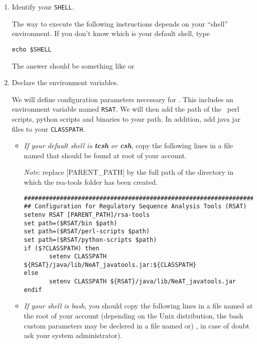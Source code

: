 \begin{enumerate}

\item Identify your \texttt{SHELL}.

  The way to execute the following instructions depends on your
  ``shell'' environment. If you don't know which is your default
  shell, type

\lstset{language=csh}

\begin{lstlisting}
echo $SHELL
\end{lstlisting}

The answer should be something like  or

\item Declare the \RSAT environment variables.

  We will define configuration parameters necessary for \RSAT.  This
  includes an environment variable named \texttt{RSAT}.  We will then
  add the path of the \RSAT \ perl scripts, python scripts and
  binaries to your path. In addition, add java jar files to your
  \texttt{CLASSPATH}.

\begin{itemize}

\item \emph{If your default shell is \textbf{tcsh} or \textbf{csh}},
  copy the following lines in a file named  that should
  be found at root of your account.

  \emph{Note}: replace [PARENT\_PATH] by the full path of the directory
  in which the rsa-tools folder has been created.

\begin{lstlisting}
################################################################
## Configuration for Regulatory Sequence Analysis Tools (RSAT)
setenv RSAT [PARENT_PATH]/rsa-tools
set path=($RSAT/bin $path)
set path=($RSAT/perl-scripts $path)
set path=($RSAT/python-scripts $path)
if ($?CLASSPATH) then
       setenv CLASSPATH ${RSAT}/java/lib/NeAT_javatools.jar:${CLASSPATH}
else
       setenv CLASSPATH ${RSAT}/java/lib/NeAT_javatools.jar
endif
\end{lstlisting}

\item \emph{If your shell is bash}, you should copy the following
  lines in a file named  at the root of your
  account (depending on the Unix distribution, the bash custom
  parameters may be declered in a file named  or)
  , in case of doubt ask your system administrator).


\end{itemize}
\end{enumerate}
